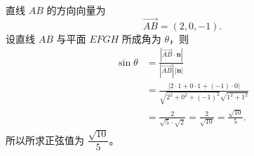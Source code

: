 \begin{answer}
直线 $AB$ 的方向向量为
\nopagebreak[4]
\[\overrightarrow{AB}=(2,0,-1).\]
设直线 $AB$ 与平面 $EFGH$ 所成角为 $\theta$，则
\nopagebreak[4]
\[\begin{aligned}
\sin\theta
&=\frac{|\overrightarrow{AB}\cdot\boldsymbol n|}
{|\overrightarrow{AB}|\,|\boldsymbol n|}\\
&=\frac{|2\cdot1+0\cdot1+(-1)\cdot0|}
{\sqrt{2^2+0^2+(-1)^2}\sqrt{1^2+1^2}}\\
&=\frac{2}{\sqrt5\cdot\sqrt2}
=\frac{2}{\sqrt{10}}
=\frac{\sqrt{10}}5.
\end{aligned}\]
所以所求正弦值为 $\dfrac{\sqrt{10}}5$。



\end{answer}
